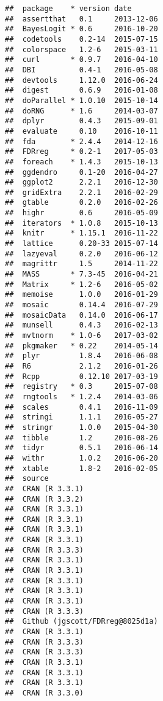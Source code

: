 \documentclass{article}\usepackage[]{graphicx}\usepackage[]{color}
\makeatletter
\newenvironment{kframe}{%
 \def\at@end@of@kframe{}%
 \ifinner\ifhmode%
  \def\at@end@of@kframe{\end{minipage}}%
  \begin{minipage}{\columnwidth}%
 \fi\fi%
 \def\FrameCommand##1{\hskip\@totalleftmargin \hskip-\fboxsep
 \colorbox{shadecolor}{##1}\hskip-\fboxsep
     \hskip-\linewidth \hskip-\@totalleftmargin \hskip\columnwidth}%
 \MakeFramed {\advance\hsize-\width
   \@totalleftmargin\z@ \linewidth\hsize
   \@setminipage}}%
 {\par\unskip\endMakeFramed%
 \at@end@of@kframe}
\newenvironment{knitrout}{}{} %
\makeatother
\begin{document}
\begin{knitrout}
\begin{kframe}
{\ttfamily\noindent\itshape\color{messagecolor}{\#\# Packages ---------------------------------------------------}}\begin{verbatim}
##  package    * version date      
##  assertthat   0.1     2013-12-06
##  BayesLogit * 0.6     2016-10-20
##  codetools    0.2-14  2015-07-15
##  colorspace   1.2-6   2015-03-11
##  curl       * 0.9.7   2016-04-10
##  DBI          0.4-1   2016-05-08
##  devtools     1.12.0  2016-06-24
##  digest       0.6.9   2016-01-08
##  doParallel * 1.0.10  2015-10-14
##  doRNG      * 1.6     2014-03-07
##  dplyr        0.4.3   2015-09-01
##  evaluate     0.10    2016-10-11
##  fda        * 2.4.4   2014-12-16
##  FDRreg     * 0.2-1   2017-05-03
##  foreach    * 1.4.3   2015-10-13
##  ggdendro     0.1-20  2016-04-27
##  ggplot2      2.2.1   2016-12-30
##  gridExtra    2.2.1   2016-02-29
##  gtable       0.2.0   2016-02-26
##  highr        0.6     2016-05-09
##  iterators  * 1.0.8   2015-10-13
##  knitr      * 1.15.1  2016-11-22
##  lattice      0.20-33 2015-07-14
##  lazyeval     0.2.0   2016-06-12
##  magrittr     1.5     2014-11-22
##  MASS       * 7.3-45  2016-04-21
##  Matrix     * 1.2-6   2016-05-02
##  memoise      1.0.0   2016-01-29
##  mosaic       0.14.4  2016-07-29
##  mosaicData   0.14.0  2016-06-17
##  munsell      0.4.3   2016-02-13
##  mvtnorm    * 1.0-6   2017-03-02
##  pkgmaker   * 0.22    2014-05-14
##  plyr         1.8.4   2016-06-08
##  R6           2.1.2   2016-01-26
##  Rcpp         0.12.10 2017-03-19
##  registry   * 0.3     2015-07-08
##  rngtools   * 1.2.4   2014-03-06
##  scales       0.4.1   2016-11-09
##  stringi      1.1.1   2016-05-27
##  stringr      1.0.0   2015-04-30
##  tibble       1.2     2016-08-26
##  tidyr        0.5.1   2016-06-14
##  withr        1.0.2   2016-06-20
##  xtable       1.8-2   2016-02-05
##  source                         
##  CRAN (R 3.3.1)                 
##  CRAN (R 3.3.2)                 
##  CRAN (R 3.3.1)                 
##  CRAN (R 3.3.1)                 
##  CRAN (R 3.3.1)                 
##  CRAN (R 3.3.1)                 
##  CRAN (R 3.3.3)                 
##  CRAN (R 3.3.1)                 
##  CRAN (R 3.3.1)                 
##  CRAN (R 3.3.1)                 
##  CRAN (R 3.3.1)                 
##  CRAN (R 3.3.1)                 
##  CRAN (R 3.3.3)                 
##  Github (jgscott/FDRreg@8025d1a)
##  CRAN (R 3.3.1)                 
##  CRAN (R 3.3.3)                 
##  CRAN (R 3.3.3)                 
##  CRAN (R 3.3.1)                 
##  CRAN (R 3.3.1)                 
##  CRAN (R 3.3.1)                 
##  CRAN (R 3.3.0)                 

\end{verbatim}
\end{kframe}
\end{knitrout}
\end{document}
